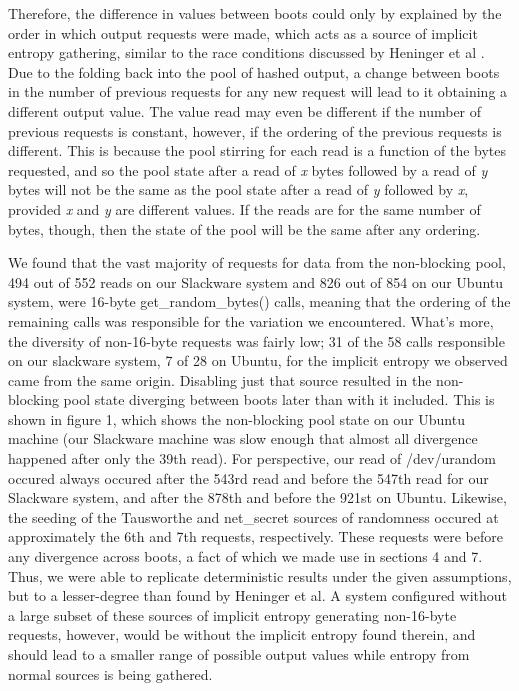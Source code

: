 Therefore, the difference in values between boots could only by explained by the order in which output requests were made, which acts as a source of implicit entropy gathering, similar to the race conditions discussed by Heninger et al \cite{pnqs}.  Due to the folding back into the pool of hashed output, a change between boots in the number of previous requests for any new request will lead to it obtaining a different output value.  The value read may even be different if the number of previous requests is constant, however, if the ordering of the previous requests is different.  This is because the pool stirring for each read is a function of the bytes requested, and so the pool state after a read of \textit{x} bytes followed by a read of \textit{y} bytes will not be the same as the pool state after a read of \textit{y} followed by \textit{x}, provided \textit{x} and \textit{y} are different values. If the reads are for the same number of bytes, though, then the state of the pool will be the same after any ordering. 

We found that the vast majority of requests for data from the non-blocking pool, 494 out of 552 reads on our Slackware system and 826 out of 854 on our Ubuntu system, were 16-byte get\_random\_bytes() calls, meaning that the ordering of the remaining calls was responsible for the variation we encountered.   What's more, the diversity of non-16-byte requests was fairly low; 31 of the 58 calls responsible on our slackware system, 7 of 28 on Ubuntu, for the implicit entropy we observed came from the same origin.  Disabling just that source resulted in the non-blocking pool state diverging between boots later than with it included.  This is shown in figure 1, which shows the non-blocking pool state on our Ubuntu machine (our Slackware machine was slow enough that almost all divergence happened after only the 39th read).  For perspective, our read of /dev/urandom occured always occured after the 543rd read and before the 547th read for our Slackware system, and after the 878th and before the 921st on Ubuntu.  Likewise, the seeding of the Tausworthe and net\_secret sources of randomness occured at approximately the 6th and 7th requests, respectively.  These requests were before any divergence across boots, a fact of which we made use in sections 4 and 7.  Thus, we were able to replicate deterministic results under the given assumptions, but to a lesser-degree than found by Heninger et al. A system configured without a large subset of these sources of implicit entropy generating non-16-byte requests, however, would be without the implicit entropy found therein, and should lead to a smaller range of possible output values while entropy from normal sources is being gathered.



